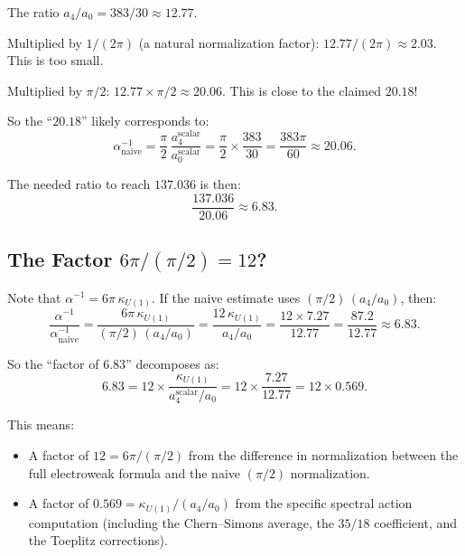 \documentclass[12pt,a4paper]{article}
\theoremstyle{definition}
\begin{document}
The ratio $a_4/a_0 = 383/30 \approx 12.77$.

Multiplied by $1/(2\pi)$ (a natural normalization factor):
$12.77/(2\pi) \approx 2.03$.  This is too small.

Multiplied by $\pi/2$: $12.77 \times \pi/2 \approx 20.06$.  This is
close to the claimed $20.18$!

So the ``$20.18$'' likely corresponds to:
\begin{equation}
\alpha^{-1}_{\text{naive}} = \frac{\pi}{2}\,
\frac{a_4^{\text{scalar}}}{a_0^{\text{scalar}}}
= \frac{\pi}{2}\times\frac{383}{30}
= \frac{383\pi}{60} \approx 20.06.
\end{equation}

The needed ratio to reach $137.036$ is then:
\begin{equation}
\frac{137.036}{20.06} \approx 6.83.
\end{equation}

\subsection{The Factor $6\pi/({\pi}/{2}) = 12$?}

Note that $\alpha^{-1} = 6\pi\,\kappa_{U(1)}$.  If the naive
estimate uses $(\pi/2)\,(a_4/a_0)$, then:
\begin{equation}
\frac{\alpha^{-1}}{\alpha^{-1}_{\text{naive}}}
= \frac{6\pi\,\kappa_{U(1)}}{(\pi/2)\,(a_4/a_0)}
= \frac{12\,\kappa_{U(1)}}{a_4/a_0}
= \frac{12 \times 7.27}{12.77} = \frac{87.2}{12.77} \approx 6.83.
\end{equation}

So the ``factor of $6.83$'' decomposes as:
\begin{equation}
6.83 = 12 \times \frac{\kappa_{U(1)}}{a_4^{\text{scalar}}/a_0}
= 12 \times \frac{7.27}{12.77} = 12 \times 0.569.
\end{equation}

This means:
\begin{itemize}
\item A factor of $12 = 6\pi/(\pi/2)$ from the difference in
  normalization between the full electroweak formula and the naive
  $(\pi/2)$ normalization.
\item A factor of $0.569 = \kappa_{U(1)}/(a_4/a_0)$ from the
  specific spectral action computation (including the Chern--Simons
  average, the $35/18$ coefficient, and the Toeplitz corrections).
\end{itemize}


\end{document}
